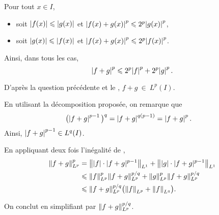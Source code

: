 \begin{solution}
\begin{reponses}
\item Pour tout $x \in I$,
\begin{itemize}
\item soit $\mathopen{}\left| f(x) \right| \leqslant \mathopen{}\left| g(x) \right|$ et $\mathopen{}\left| f(x) + g(x) \right|^p \leqslant 2^p \mathopen{}\left| g(x) \right|^p$,
\item soit $\mathopen{}\left| g(x) \right| \leqslant \mathopen{}\left| f(x) \right|$ et $\mathopen{}\left| f(x) + g(x) \right|^p \leqslant 2^p \mathopen{}\left| f(x) \right|^p$.
\end{itemize}
Ainsi, dans tous les cas,
\[
\mathopen{}\left| f + g \right|^p \leqslant 2^p \mathopen{}\left| f \right|^p + 2^p \mathopen{}\left| g \right|^p.
\]

\item D'après la question précédente et le , $f + g~\in~L^p(I)$.

\item En utilisant la décomposition proposée, on remarque que
\begin{align*}
\big(\mathopen{}\mathopen{}\left| f + g \right|^{p-1}\big)^q
&= \mathopen{}\left| f + g \right|^{q(p-1)}
= \mathopen{}\left| f + g \right|^p.
\end{align*}
Ainsi, $\mathopen{}\left| f + g \right|^{p-1} \in L^q(I)$.

En appliquant deux fois l'inégalité de ,
\begin{align*}
\norm{f + g}_{L^p}^p
&= \norm{|f| \cdot |f + g|^{p-1}}_{L^1}
+ \norm{|g| \cdot |f + g|^{p-1}}_{L^1}\\
&\leqslant \norm{f}_{L^p}^p \norm{f + g}_{L^p}^{p/q}
+ \norm{g}_{L^p}^p \norm{f + g}_{L^p}^{p/q}\\
&\leqslant \norm{f + g}_{L^p}^{p/q} \big(\norm{f}_{L^p} + \norm{f}_{L^q}\big).
\end{align*}

On conclut en simplifiant par $\norm{f + g}_{L^p}^{p/q}$.
\end{reponses}
\end{solution}



